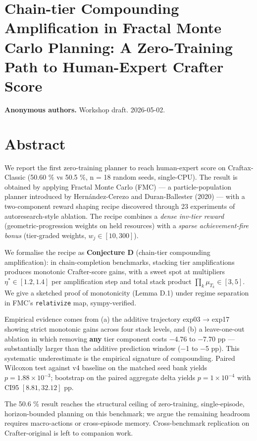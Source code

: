 \section{Chain-tier Compounding Amplification in Fractal Monte Carlo Planning: A Zero-Training Path to Human-Expert Crafter Score}

\textbf{Anonymous authors.} Workshop draft. 2026-05-02.

\hrulefill

\section{Abstract}

We report the first zero-training planner to reach human-expert score
on Craftax-Classic (50.60 \% vs 50.5 \%, n = 18 random seeds, single-CPU).
The result is obtained by applying Fractal Monte Carlo (FMC) — a
particle-population planner introduced by Hernández-Cerezo and
Duran-Ballester (2020) — with a two-component reward shaping recipe
discovered through 23 experiments of autoresearch-style ablation. The
recipe combines a \emph{dense inv-tier reward} (geometric-progression weights
on held resources) with a \emph{sparse achievement-fire bonus} (tier-graded
weights, $w_j \in [10, 300]$).

We formalise the recipe as \textbf{Conjecture D} (chain-tier compounding
amplification): in chain-completion benchmarks, stacking tier
amplifications produces monotonic Crafter-score gains, with a sweet
spot at multipliers $\eta^* \in [1.2, 1.4]$ per amplification step and
total stack product $\prod_k \mu_{T_k} \in [3, 5]$. We give a sketched
proof of monotonicity (Lemma D.1) under regime separation in FMC's
\texttt{relativize} map, sympy-verified.

Empirical evidence comes from (a) the additive trajectory exp03 → exp17
showing strict monotonic gains across four stack levels, and (b) a
leave-one-out ablation in which removing \textbf{any} tier component costs
−4.76 to −7.70 pp — substantially larger than the additive prediction
window (−1 to −5 pp). This systematic underestimate is the empirical
signature of compounding. Paired Wilcoxon test against v4 baseline
on the matched seed bank yields $p = 1.88 \times 10^{-3}$; bootstrap
on the paired aggregate delta yields $p = 1 \times 10^{-4}$ with
CI95 $[8.81, 32.12]$ pp.

The 50.6 \% result reaches the structural ceiling of zero-training,
single-episode, horizon-bounded planning on this benchmark; we argue
the remaining headroom requires macro-actions or cross-episode memory.
Cross-benchmark replication on Crafter-original is left to companion
work.

